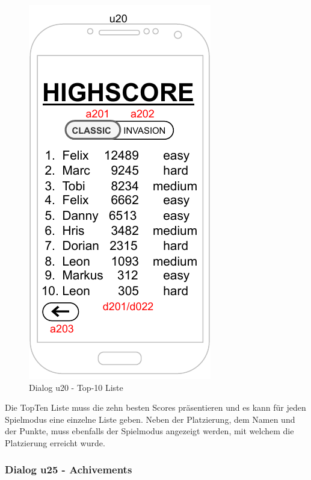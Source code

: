\begin{figure}
    \begin{center}
    \includegraphics{diagramme/pdf/Mockup-u20.pdf}
\end{center}
    \caption{Dialog u20 - Top-10 Liste}
\end{figure}

Die TopTen Liste muss die zehn besten Scores präsentieren und es kann für jeden Spielmodus eine einzelne Liste geben. 
Neben der Platzierung, dem Namen und der Punkte, muss ebenfalls der Spielmodus angezeigt werden, mit welchem die Platzierung erreicht wurde.
\clearpage

\subsubsection{Dialog u25 - Achivements}

